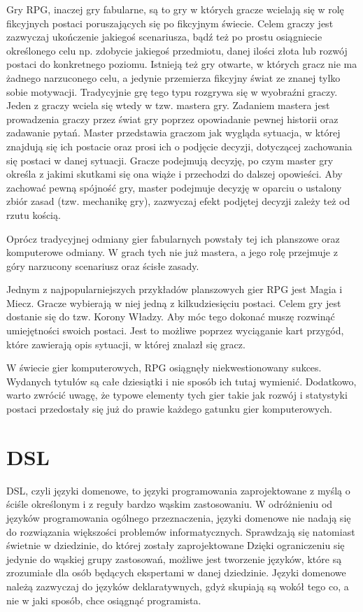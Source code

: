 \documentclass{xmgr}
\begin{document}
Gry RPG, inaczej gry fabularne, są to gry w których gracze wcielają się w rolę fikcyjnych postaci poruszających się po fikcyjnym świecie.  Celem graczy jest zazwyczaj ukończenie jakiegoś scenariusza, bądź też po prostu osiągniecie określonego celu np. zdobycie jakiegoś przedmiotu, danej ilości złota lub rozwój postaci do konkretnego poziomu. Istnieją też gry otwarte, w których gracz nie ma żadnego narzuconego celu, a jedynie przemierza fikcyjny świat ze znanej tylko sobie motywacji. Tradycyjnie grę tego typu rozgrywa się w wyobraźni graczy. Jeden z graczy wciela się wtedy w tzw. mastera gry. Zadaniem mastera jest prowadzenia graczy przez świat gry poprzez opowiadanie pewnej historii oraz zadawanie pytań. Master przedstawia graczom jak wygląda sytuacja, w której znajdują się ich postacie oraz prosi ich o podjęcie decyzji, dotyczącej zachowania się postaci w danej sytuacji. Gracze podejmują decyzję, po czym master gry określa z jakimi skutkami się ona wiąże i przechodzi do dalszej opowieści. Aby zachować pewną spójność gry, master podejmuje decyzję w oparciu o ustalony zbiór zasad (tzw. mechanikę gry), zazwyczaj efekt podjętej decyzji zależy też od rzutu kością.

Oprócz tradycyjnej odmiany gier fabularnych powstały tej ich planszowe oraz komputerowe odmiany. W grach tych nie już mastera, a jego rolę przejmuje z góry narzucony scenariusz oraz ścisłe zasady. 

Jednym z najpopularniejszych przykładów planszowych gier RPG jest Magia i Miecz. Gracze wybierają w niej jedną z kilkudziesięciu postaci. Celem gry jest dostanie się do tzw. Korony Władzy. Aby móc tego dokonać muszę rozwinąć umiejętności swoich postaci. Jest to możliwe poprzez wyciąganie kart przygód, które zawierają opis sytuacji, w której znalazł się gracz. 

W świecie gier komputerowych, RPG osiągnęły niekwestionowany sukces. Wydanych tytułów są całe dziesiątki i nie sposób ich tutaj wymienić. Dodatkowo, warto zwrócić uwagę, że typowe elementy tych gier takie jak rozwój i statystyki postaci przedostały się już do prawie każdego gatunku gier komputerowych.

\section{DSL}

DSL, czyli języki domenowe, to języki programowania zaprojektowane z myślą o ściśle określonym i z reguły bardzo wąskim zastosowaniu. W odróżnieniu od języków programowania ogólnego przeznaczenia, języki domenowe nie nadają się do rozwiązania większości problemów informatycznych. Sprawdzają się natomiast świetnie w dziedzinie, do której zostały zaprojektowane Dzięki ograniczeniu się jedynie do wąskiej grupy zastosowań, możliwe jest tworzenie języków, które są zrozumiałe dla osób będących ekspertami w danej dziedzinie. Języki domenowe należą zazwyczaj do języków deklaratywnych, gdyż skupiają są wokół tego co, a nie w jaki sposób, chce osiągnąć programista.
\end{document}
